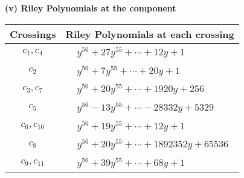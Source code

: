 \documentclass[1p]{elsarticle_modified}
\theoremstyle{definition}
\begin{document}
\newpage\renewcommand{\arraystretch}{1}
\flushleft \textbf{(v) Riley Polynomials at the component}\newline \\
\begin{tabular}{m{50pt}|m{274pt}}
Crossings & \hspace{64pt}Riley Polynomials at each crossing \\
\hline $$\begin{aligned}c_{1},c_{4}\end{aligned}$$&$\begin{aligned}
&y^{56}+27 y^{55}+\cdots+12 y+1
\end{aligned}$\\
\hline $$\begin{aligned}c_{2}\end{aligned}$$&$\begin{aligned}
&y^{56}+7 y^{55}+\cdots+20 y+1
\end{aligned}$\\
\hline $$\begin{aligned}c_{3},c_{7}\end{aligned}$$&$\begin{aligned}
&y^{56}+20 y^{55}+\cdots+1920 y+256
\end{aligned}$\\
\hline $$\begin{aligned}c_{5}\end{aligned}$$&$\begin{aligned}
&y^{56}-13 y^{55}+\cdots-28332 y+5329
\end{aligned}$\\
\hline $$\begin{aligned}c_{6},c_{10}\end{aligned}$$&$\begin{aligned}
&y^{56}+19 y^{55}+\cdots+12 y+1
\end{aligned}$\\
\hline $$\begin{aligned}c_{8}\end{aligned}$$&$\begin{aligned}
&y^{56}+20 y^{55}+\cdots+1892352 y+65536
\end{aligned}$\\
\hline $$\begin{aligned}c_{9},c_{11}\end{aligned}$$&$\begin{aligned}
&y^{56}+39 y^{55}+\cdots+68 y+1
\end{aligned}$\\
\hline
\end{tabular}\\~\\
\end{document}
